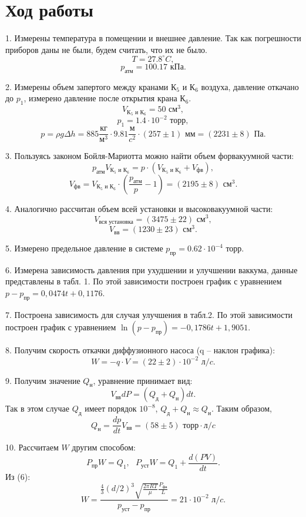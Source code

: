 \section{Ход работы}
1. Измерены температура в помещении и внешнее давление. Так как погрешности приборов даны не были, будем считать, что их не было.
\[T = 27.8 ^\circ C,\]
\[p_\text{атм} = 100.17 \text{ кПа}.\]

2. Измерены объем запертого между кранами К$_5$ и К$_6$ воздуха, давление откачано до $p_1$, измерено давление после открытия крана К$_6$.
\[V_\text{К$_5$ и К$_6$} = 50 \text{ см}^3,\]
\[p_1 = 1.4 \cdot 10^{-2} \text{ торр},\]
\[p = \rho g\Delta h = 885 \frac{\text{кг}}{\text{м}^3} \cdot 9.81 \frac{\text{м}}{c^2} \cdot \left(257 \pm 1\right) \text { мм} = \left(2231 \pm 8\right) \text{ Па}.\]

3. Пользуясь законом Бойля-Мариотта можно найти объем форвакуумной части:
\[p_\text{атм} V_\text{К$_5$ и К$_6$} = p \cdot \left(V_\text{К$_5$ и К$_6$} + V_\text{фв}\right),\]
\[V_\text{фв} = V_\text{К$_5$ и К$_6$}\cdot\left(\frac {p_\text{атм}} p - 1\right) = \left(2195 \pm 8\right) \text{ см}^3.\]

4. Аналогично рассчитан объем всей установки и высоковакуумной части:
\[V_\text{вся установка} = \left(3475 \pm 22\right) \text{ см}^3,\]
\[V_\text{вв} = \left(1230 \pm 23\right) \text{ см}^3.\]

5. Измерено предельное давление в системе $p_\text{пр} = 0.62 \cdot 10^{-4} \text{ торр}$.

6. Измерена зависимость давления при ухудшении и улучшении ваккума, данные представлены в табл. 1.
По этой зависимости построен график с уравнением $p - p_\text{пр} = 0,0474t + 0,1176$.

7. Построена зависимость для случая улучшения в табл.2.
По этой зависимости построен график с уравнением $\ln(p - p_\text{пр}) = -0,1786t + 1,9051$.

8. Получим скорость откачки диффузионного насоса (q -- наклон графика):
\[W = -q\cdot V = (22 \pm 2) \cdot 10^{-2} \text{ л}/c.\]

9. Получим значение $Q_\text{н}$, уравнение принимает вид:
\[V_\text{вв}dP = \left(Q_\text{д} + Q_\text{н}\right) dt.\]
Так в этом случае $Q_\text{д}$ имеет порядок $10^{-8}$, $Q_\text{д} + Q_\text{н} \approx Q_\text{н}$. Таким образом,
\[Q_\text{н} = \frac{dp}{dt} V_\text{вв} = (58 \pm 5) \text{ торр}\cdot \text{л} / c\]

10. Рассчитаем $W$ другим способом:
\[P_\text{пр}W = Q_1, \text{    } P_\text{уст}W = Q_1 + \frac{d\left(PV\right)}{dt}.\]
Из (6):
\[W = \frac{\frac{4}{3}(d/2)^3\sqrt{\frac{2\pi RT}{\mu}}\frac{P_\text{фв}}{L}}{p_\text{уст} - p_\text{пр}} = 21 \cdot 10^{-2} \text{ л}/c.\]



